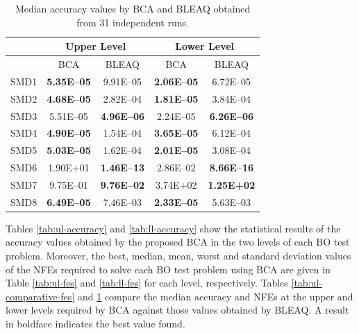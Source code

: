 \documentclass[conference]{IEEEtran}
\begin{document}
\begin{table}[!ht]
\renewcommand{\arraystretch}{1.3}
    \caption{Median accuracy values by BCA and BLEAQ obtained from 31 independent runs.}
    \label{tab:ll-comparative-vals}
    \centering
    \begin{tabular}{|c|c|c||c|c|}
\hline
& \multicolumn{2}{c||}{Upper Level} & \multicolumn{2}{c|}{Lower Level} \\ \hline
& BCA & BLEAQ & BCA & BLEAQ \\ \hline
SMD1  & \textbf{5.35E--05} &          9.91E--05 & \textbf{2.06E--05} &          6.72E--05 \\ \hline
SMD2  & \textbf{4.68E--05} &          2.82E--04 & \textbf{1.81E--05} &          3.84E--04 \\ \hline
SMD3  &          5.51E--05 & \textbf{4.96E--06} &          2.24E--05 & \textbf{6.26E--06} \\ \hline
SMD4  & \textbf{4.90E--05} &          1.54E--04 & \textbf{3.65E--05} &          6.12E--04 \\ \hline
SMD5  & \textbf{5.03E--05} &          1.62E--04 & \textbf{2.01E--05} &          3.08E--04 \\ \hline
SMD6  &           1.90E+01 & \textbf{1.46E--13} &          2.86E--02 & \textbf{8.66E--16} \\ \hline
SMD7  &          9.75E--01 & \textbf{9.76E--02} &           3.74E+02 &  \textbf{1.25E+02} \\ \hline
SMD8  & \textbf{6.49E--05} &          7.46E--03 & \textbf{2.33E--05} &          5.63E--03 \\ \hline

    \end{tabular}
\end{table}






Tables \ref{tab:ul-accuracy} and \ref{tab:ll-accuracy} show the statistical results
of the accuracy values obtained by the proposed BCA in the two levels of each BO
test problem. Moreover, the best, median, mean, worst and standard deviation values
of the NFEs required to solve each BO test problem using BCA are given in
Table \ref{tab:ul-fes} and \ref{tab:ll-fes} for each level, respectively. 
Tables \ref{tab:ul-comparative-fes} and \ref{tab:ll-comparative-vals} compare the
median accuracy and NFEs at the upper and lower levels required by BCA against
those values obtained by BLEAQ. A result in boldface indicates the best value found.
\end{document}
